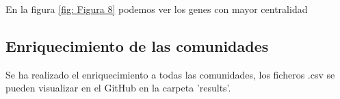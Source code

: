 \begin{minipage}{\linewidth}
	\label{fig: Figura 7}
\end{minipage}


En la figura \ref{fig: Figura 8} podemos ver los genes con mayor centralidad

\begin{minipage}{\linewidth}
	\label{fig: Figura 8}
\end{minipage}



\subsection{Enriquecimiento de las comunidades}
Se ha realizado el enriquecimiento a todas las comunidades, los ficheros .csv se pueden visualizar en el GitHub en la carpeta 'results'.

